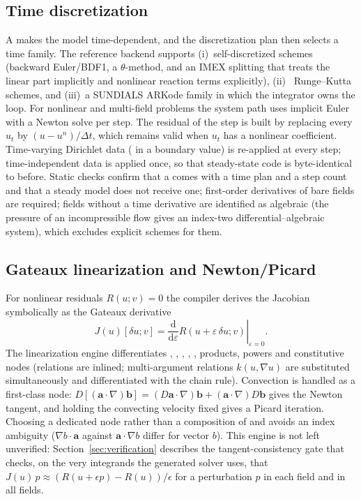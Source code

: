 \subsection{Time discretization}
A  makes the model time-dependent, and the discretization plan then selects a time family. The reference backend supports (i)~self-discretized schemes (backward Euler/BDF1, a $\theta$-method, and an IMEX splitting that treats the linear part implicitly and nonlinear reaction terms explicitly), (ii)~\dealii{} Runge--Kutta schemes, and (iii)~a SUNDIALS ARKode family in which the integrator owns the loop. For nonlinear and multi-field problems the system path uses implicit Euler with a Newton solve per step. The residual of the step is built by replacing every $u_t$ by $(u-u^{n})/\Delta t$, which remains valid when $u_t$ has a nonlinear coefficient. Time-varying Dirichlet data ( in a boundary value) is re-applied at every step; time-independent data is applied once, so that steady-state code is byte-identical to before. Static checks confirm that a  comes with a time plan and a step count and that a steady model does not receive one; first-order derivatives of bare fields are required; fields without a time derivative are identified as algebraic (the pressure of an incompressible flow gives an index-two differential--algebraic system), which excludes explicit schemes for them.

\subsection{Gateaux linearization and Newton/Picard}
For nonlinear residuals $R(u;v)=0$ the compiler derives the Jacobian symbolically as the Gateaux derivative
\begin{equation}
J(u)[\delta u;v]=\left.\frac{\mathrm d}{\mathrm d\varepsilon}R(u+\varepsilon\,\delta u;v)\right|_{\varepsilon=0}.
\end{equation}
The linearization engine differentiates , , , , , products, powers and constitutive  nodes (relations are inlined; multi-argument relations $k(u,\nabla u)$ are substituted simultaneously and differentiated with the chain rule). Convection is handled as a first-class node: $D[(\mathbf a\cdot\nabla)\mathbf b]=(D\mathbf a\cdot\nabla)\mathbf b+(\mathbf a\cdot\nabla)D\mathbf b$ gives the Newton tangent, and holding the convecting velocity fixed gives a Picard iteration. Choosing a dedicated node rather than a composition of  and  avoids an index ambiguity ($\nabla b\cdot\mathbf a$ against $\mathbf a\cdot\nabla b$ differ for vector $b$). This engine is not left unverified: Section~\ref{sec:verification} describes the tangent-consistency gate that checks, on the very integrands the generated solver uses, that $J(u)\,p\approx(R(u+\epsilon p)-R(u))/\epsilon$ for a perturbation $p$ in each field and in all fields.

